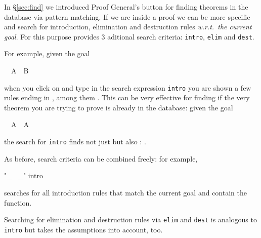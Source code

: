 %
\begin{isabellebody}%
\def\isabellecontext{find{\isadigit{2}}}%
\isamarkupfalse%
\isamarkupfalse%
%
\begin{isamarkuptxt}%
 In
\S\ref{sec:find} we introduced Proof General's  button
for finding theorems in the database via pattern matching. If we are
inside a proof we can be more specific and search for introduction,
elimination and destruction rules \emph{w.r.t.\ the current goal}.
For this purpose  provides 3 aditional search criteria:
\texttt{intro}, \texttt{elim} and \texttt{dest}.

For example, given the goal \begin{isabelle}%
\ {}{\isachardot}\ A\ {\isasymand}\ B%
\end{isabelle}
when you click on  and type in the search expression
\texttt{intro} you are shown a few rules ending in ,
among them . This can be very effective for finding
if the very theorem you are trying to prove is already in the
database: given the goal%
\end{isamarkuptxt}%
\isamarkuptrue%
\isamarkupfalse%
\isamarkupfalse%
%
\begin{isamarkuptxt}%
\vspace{-\bigskipamount}
\begin{isabelle}%
\ {}{\isachardot}\ A\ {\isasymlongrightarrow}\ A%
\end{isabelle}
the search for \texttt{intro} finds not just 
but also : .

As before, search criteria can be combined freely: for example,
\begin{ttbox}
"_ \at\ _"  intro
\end{ttbox}
searches for all introduction rules that match the current goal and
contain the \isa{{\isacharat}} function.

Searching for elimination and destruction rules via \texttt{elim} and
\texttt{dest} is analogous to \texttt{intro} but takes the assumptions
into account, too.%
\end{isamarkuptxt}%
\isamarkuptrue%
\isamarkupfalse%
\isamarkupfalse%
\end{isabellebody}%
